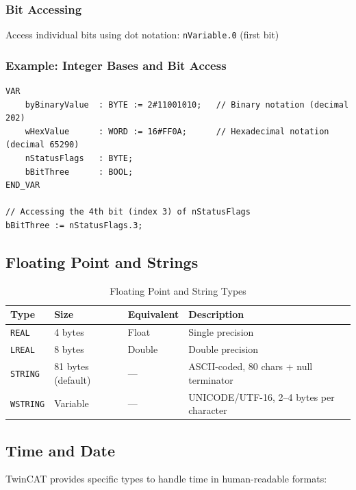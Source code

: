 \documentclass[11pt,a4paper]{article}
\begin{document}
\subsubsection{Bit Accessing}

Access individual bits using dot notation: \texttt{nVariable.0} (first bit)

\subsubsection*{Example: Integer Bases and Bit Access}

\begin{lstlisting}
VAR
    byBinaryValue  : BYTE := 2#11001010;   // Binary notation (decimal 202)
    wHexValue      : WORD := 16#FF0A;      // Hexadecimal notation (decimal 65290)
    nStatusFlags   : BYTE;
    bBitThree      : BOOL;
END_VAR

// Accessing the 4th bit (index 3) of nStatusFlags
bBitThree := nStatusFlags.3;
\end{lstlisting}

\subsection{Floating Point and Strings}

\begin{table}[h]
\centering
\begin{tabular}{@{}llll@{}}
\toprule
\textbf{Type} & \textbf{Size} & \textbf{Equivalent} & \textbf{Description} \\
\midrule
\texttt{REAL} & 4 bytes & Float & Single precision \\
\texttt{LREAL} & 8 bytes & Double & Double precision \\
\texttt{STRING} & 81 bytes (default) & --- & ASCII-coded, 80 chars + null terminator \\
\texttt{WSTRING} & Variable & --- & UNICODE/UTF-16, 2--4 bytes per character \\
\bottomrule
\end{tabular}
\caption{Floating Point and String Types}
\end{table}

\subsection{Time and Date}

TwinCAT provides specific types to handle time in human-readable formats:
\end{document}
